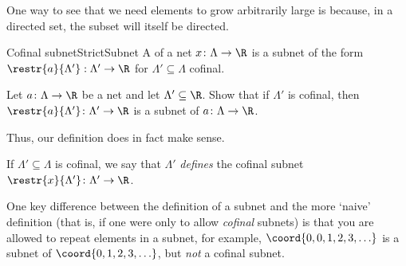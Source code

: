 One way to see that we need elements to grow arbitrarily large is because, in a directed set, the subset will itself be directed.
\begin{dfn}{Cofinal subnet}{StrictSubnet}
A  of a net $x\colon \Lambda \rightarrow \R$ is a subnet of the form $\restr{a}{\Lambda '}:\Lambda '\rightarrow \R$ for $\Lambda '\subseteq \Lambda$ cofinal.
\begin{exr}[breakable=false]{}{}
Let $a\colon \Lambda \rightarrow \R$ be a net and let $\Lambda '\subseteq \R$.  Show that if $\Lambda '$ is cofinal, then $\restr{a}{\Lambda '}\colon \Lambda '\rightarrow \R$ is a subnet of $a\colon \Lambda \rightarrow \R$.
\begin{rmk}
Thus, our definition does in fact make sense.
\end{rmk}
\end{exr}
\begin{rmk}
If $\Lambda '\subseteq \Lambda$ is cofinal, we say that $\Lambda '$ \emph{defines} the cofinal subnet $\restr{x}{\Lambda '}\colon \Lambda '\rightarrow \R$.
\end{rmk}
\begin{rmk}
One key difference between the definition of a subnet and the more `naive' definition (that is, if one were only to allow \emph{cofinal} subnets) is that you are allowed to repeat elements in a subnet, for example, $\coord{0,0,1,2,3,\ldots}$ is a subnet of $\coord{0,1,2,3,\ldots}$, but \emph{not} a cofinal subnet.
\end{rmk}
\end{dfn}

